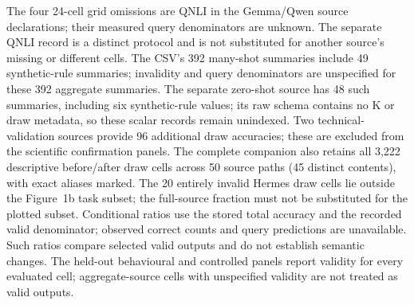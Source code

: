 \begin{table}[t]
The four 24-cell grid omissions are QNLI in the Gemma/Qwen source declarations;
their measured query denominators are unknown. The separate QNLI record is a
distinct protocol and is not substituted for another source's missing or different
cells. The CSV's 392 many-shot summaries include 49 synthetic-rule summaries;
invalidity and query denominators are unspecified for these 392 aggregate summaries. The separate zero-shot
source has 48 such summaries, including six synthetic-rule values; its raw schema
contains no K or draw metadata, so these scalar records remain unindexed. Two technical-validation sources provide 96 additional draw accuracies; these
are excluded from the scientific confirmation panels. The complete companion also retains all 3,222 descriptive before/after
draw cells across 50 source paths (45 distinct contents), with exact aliases marked.
The 20 entirely invalid Hermes draw cells lie outside the Figure~1b task subset;
the full-source fraction must not be substituted for the plotted subset. Conditional
ratios use the stored total accuracy and the recorded valid denominator; observed
correct counts and query predictions are unavailable. Such ratios compare selected
valid outputs and do not establish semantic changes. The held-out behavioural and controlled panels report validity for every evaluated
cell; aggregate-source cells with unspecified validity are not treated as valid outputs.
\end{table}

